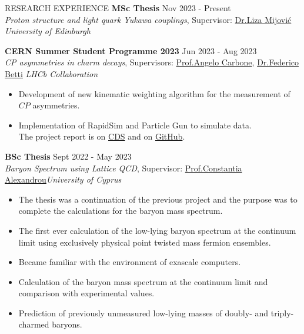 \documentclass{resume} %
\begin{document}
        \begin{rSection}{RESEARCH EXPERIENCE}
                \textbf{MSc Thesis} \hfill Nov 2023 - Present\\
                {\it Proton structure and light quark Yukawa couplings}, Supervisor: \href{https://www.ph.ed.ac.uk/people/liza-mijovic}{Dr.\@ Liza Mijovi\'c} \hfill \textit{University of Edinburgh}

                \textbf{CERN Summer Student Programme 2023} \hfill Jun 2023 - Aug 2023\\
                {\it CP asymmetries in charm decays}, Supervisors: \href{https://www.unibo.it/sitoweb/angelo.carbone/en}{Prof.\@ Angelo Carbone}, \href{https://www.ph.ed.ac.uk/people/federico-betti}{Dr.\@ Federico Betti}
                \hfill \textit{LHCb Collaboration}
                \begin{itemize}
                        \itemsep -3pt {}
                        \item Development of new kinematic weighting algorithm for the measurement of $CP$ asymmetries.
                        \item Implementation of RapidSim and Particle Gun to simulate data.\\ The project report is on \href{https://cds.cern.ch/record/2866568/}{CDS} and on \href{https://github.com/GiorgosChr/CERN_Summer_Student_Programme_2023}{GitHub}.
                \end{itemize}

                \textbf{BSc Thesis} \hfill Sept 2022 - May 2023\\
                {\it Baryon Spectrum using Lattice QCD}, Supervisor:  \href{https://www.cyi.ac.cy/index.php/castorc/about-the-center/castorc-our-people/itemlist/user/99-constantia-alexandrou.html}{Prof.\@ Constantia Alexandrou}\hfill \textit{University of Cyprus}
                \begin{itemize}
                        \itemsep -3pt {} 
                        \item The thesis was a continuation of the previous project and the purpose was to complete the calculations for the baryon mass spectrum.
                        \item The first ever calculation of the low-lying baryon spectrum at the continuum limit using exclusively physical point twisted mass fermion ensembles.
                        \item Became familiar with the environment of exascale computers.
                        \item Calculation of the baryon mass spectrum at the continuum limit and comparison with experimental values.
                        \item Prediction of previously unmeasured low-lying masses of doubly- and triply-charmed baryons.
                \end{itemize}


\end{rSection}
\end{document}
